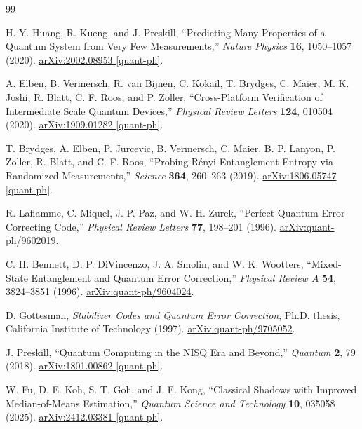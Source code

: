\documentclass[12pt,a4paper,oneside]{book}
\theoremstyle{plain}
\theoremstyle{definition}
\theoremstyle{remark}
\begin{document}
\begin{thebibliography}{99}

H.-Y. Huang, R. Kueng, and J. Preskill,
``Predicting Many Properties of a Quantum System from Very Few Measurements,''
\emph{Nature Physics} \textbf{16}, 1050--1057 (2020).
\href{https://arxiv.org/abs/2002.08953}{arXiv:2002.08953 [quant-ph]}.

A. Elben, B. Vermersch, R. van Bijnen, C. Kokail, T. Brydges, C. Maier, M. K. Joshi, R. Blatt, C. F. Roos, and P. Zoller,
``Cross-Platform Verification of Intermediate Scale Quantum Devices,''
\emph{Physical Review Letters} \textbf{124}, 010504 (2020).
\href{https://arxiv.org/abs/1909.01282}{arXiv:1909.01282 [quant-ph]}.

T. Brydges, A. Elben, P. Jurcevic, B. Vermersch, C. Maier, B. P. Lanyon, P. Zoller, R. Blatt, and C. F. Roos,
``Probing R\'enyi Entanglement Entropy via Randomized Measurements,''
\emph{Science} \textbf{364}, 260--263 (2019).
\href{https://arxiv.org/abs/1806.05747}{arXiv:1806.05747 [quant-ph]}.

R. Laflamme, C. Miquel, J. P. Paz, and W. H. Zurek,
``Perfect Quantum Error Correcting Code,''
\emph{Physical Review Letters} \textbf{77}, 198--201 (1996).
\href{https://arxiv.org/abs/quant-ph/9602019}{arXiv:quant-ph/9602019}.

C. H. Bennett, D. P. DiVincenzo, J. A. Smolin, and W. K. Wootters,
``Mixed-State Entanglement and Quantum Error Correction,''
\emph{Physical Review A} \textbf{54}, 3824--3851 (1996).
\href{https://arxiv.org/abs/quant-ph/9604024}{arXiv:quant-ph/9604024}.

D. Gottesman,
\emph{Stabilizer Codes and Quantum Error Correction},
Ph.D. thesis, California Institute of Technology (1997).
\href{https://arxiv.org/abs/quant-ph/9705052}{arXiv:quant-ph/9705052}.

J. Preskill,
``Quantum Computing in the NISQ Era and Beyond,''
\emph{Quantum} \textbf{2}, 79 (2018).
\href{https://arxiv.org/abs/1801.00862}{arXiv:1801.00862 [quant-ph]}.

W. Fu, D. E. Koh, S. T. Goh, and J. F. Kong,
``Classical Shadows with Improved Median-of-Means Estimation,''
\emph{Quantum Science and Technology} \textbf{10}, 035058 (2025).
\href{https://arxiv.org/abs/2412.03381}{arXiv:2412.03381 [quant-ph]}.


\end{thebibliography}
\end{document}
